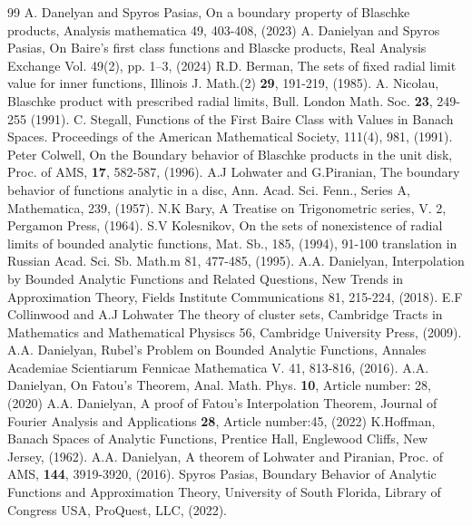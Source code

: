 \documentclass[12pt]{article}
\begin{document}
\begin{thebibliography}{99}
 A. Danelyan and Spyros Pasias, On a boundary property of Blaschke products, Analysis mathematica 49, 403-408, (2023)
 A. Danielyan and Spyros Pasias, On Baire's first class functions and Blascke products, Real Analysis Exchange Vol. 49(2), pp. 1–3, (2024)
 R.D. Berman, The sets of fixed radial limit value for inner functions, Illinois J. Math.(2) \textbf{29}, 191-219, (1985).
 A. Nicolau, Blaschke product with prescribed radial limits, Bull. London Math. Soc. \textbf{23}, 249-255 (1991).
 C. Stegall, Functions of the First Baire Class with Values in Banach Spaces. Proceedings of the American Mathematical Society, 111(4), 981, (1991).
 Peter Colwell, On the Boundary behavior of Blaschke products in the unit disk, Proc. of AMS, \textbf{17}, 582-587, (1996).
 A.J Lohwater and G.Piranian, The boundary behavior of functions analytic in a disc, Ann. Acad. Sci. Fenn., Series A, Mathematica, 239, (1957).
 N.K Bary, A Treatise on Trigonometric series, V. 2, Pergamon Press, (1964).
 S.V Kolesnikov, On the sets of nonexistence of radial limits of bounded analytic functions, Mat. Sb., 185, (1994), 91-100 translation in Russian Acad. Sci. Sb. Math.m 81, 477-485, (1995).
 A.A. Danielyan, Interpolation by Bounded Analytic Functions and Related Questions, New Trends in Approximation Theory, Fields Institute Communications 81, 215-224, (2018).
 E.F Collinwood and A.J Lohwater The theory of cluster sets, Cambridge Tracts in Mathematics and Mathematical Physiscs 56, Cambridge University Press, (2009).
 A.A. Danielyan, Rubel's Problem on Bounded Analytic Functions, Annales Academiae Scientiarum Fennicae Mathematica V. 41, 813-816, (2016).
 A.A. Danielyan, On Fatou's Theorem, Anal. Math. Phys. \textbf{10}, Article number: 28, (2020)
 A.A. Danielyan, A proof of Fatou's Interpolation Theorem, Journal of Fourier Analysis and Applications \textbf{28}, Article number:45, (2022)
 K.Hoffman, Banach Spaces of Analytic Functions, Prentice Hall, Englewood Cliffs, New Jersey, (1962).
 A.A. Danielyan, A theorem of Lohwater and Piranian, Proc. of AMS, \textbf{144}, 3919-3920, (2016).
	Spyros Pasias, Boundary Behavior of Analytic Functions and Approximation Theory, University of South Florida, Library of Congress USA, ProQuest, LLC, (2022).

\end{thebibliography}
\end{document}
